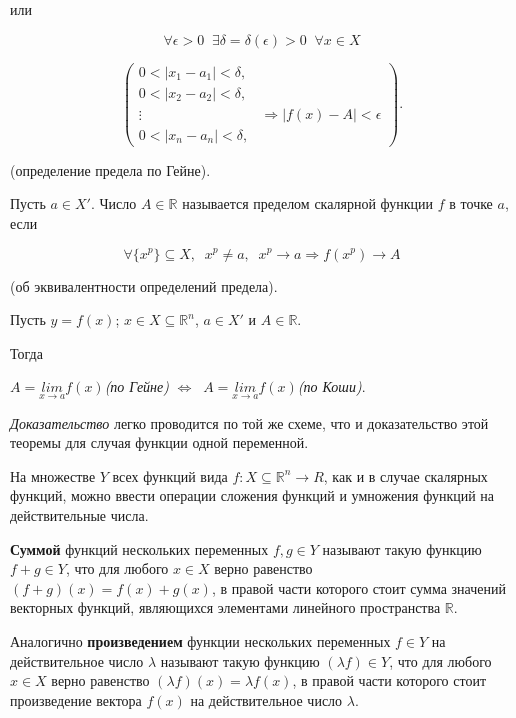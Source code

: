 или 

$$\forall\epsilon>0\;\;\exists\delta=\delta(\epsilon)>0\;\;\forall{x}\in{X}$$

$$
\begin{pmatrix}
0<\vert{x_1-a_1}\vert<\delta, & \; \\
0<\vert{x_2-a_2}\vert<\delta, & \; \\
\vdots & \Rightarrow\vert{f(x)-A}\vert<\epsilon  \\
0<\vert{x_n-a_n}\vert<\delta, & \;
\end{pmatrix}
.$$

\;

\begin{definition}
    (определение предела по Гейне).

    Пусть $a\in{X'}$. Число $A\in{\mathbb{R}}$ называется пределом скалярной функции $f$ в точке $a$, если 
\end{definition}

$$\forall\lbrace{x^p}\rbrace\subseteq{X},\;\;x^p\neq{a},\;\;x^p\rightarrow{a}\Rightarrow{f(x^p)\rightarrow{A}}$$

\;

\begin{theorem}
    (об эквивалентности определений предела). 

Пусть $y = f(x)$; $x\in{X}\subseteq\mathbb{R}^n$, $a\in{X'}$ и $A\in\mathbb{R}$.

Тогда

$A=\underset{x\rightarrow{a}}{lim}f(x)$\textit{(по Гейне)} $\Leftrightarrow\;\;A=\underset{x\rightarrow{a}}{lim}f(x)$\textit{(по Коши)}.
\end{theorem}

\textit{Доказательство} легко проводится по той же схеме, что и доказательство этой теоремы для случая функции одной переменной.

\;

На множестве $Y$ всех функций вида $f:X\subseteq\mathbb{R}^n\rightarrow{R}$, как и в случае скалярных функций, 
можно ввести операции сложения функций и умножения функций на действительные числа.

\textbf{Суммой} функций нескольких переменных $f,g\in{Y}$ называют такую функцию $f+g\in{Y}$, 
что для любого $x\in{X}$ верно равенство $(f+g)(x)=f(x)+g(x)$, в правой части которого стоит сумма значений векторных функций, 
являющихся элементами линейного пространства $\mathbb{R}$. 

Аналогично \textbf{произведением} функции нескольких переменных $f\in{Y}$ на действительное число $\lambda$ 
называют такую функцию $(\lambda{f})\in{Y}$, 
что для любого $x\in{X}$ верно равенство $(\lambda{f})(x)=\lambda{f}(x)$, в правой части которого стоит произведение вектора 
$f(x)$ на действительное число $\lambda$.